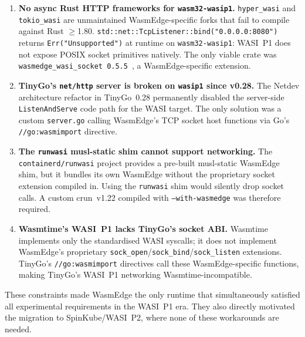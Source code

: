 \begin{enumerate}
    \item \textbf{No async Rust HTTP frameworks for \texttt{wasm32-wasip1}.}
          \texttt{hyper\_wasi} and \texttt{tokio\_wasi} are unmaintained \acs{WasmEdge}-specific forks that fail to compile against Rust $\geq$1.80. \texttt{std::net::TcpListener::bind("0.0.0.0:8080")} returns \texttt{Err("Unsupported")} at runtime on \texttt{wasm32-wasip1}: \acs{WASI}~P1 does not expose \acs{POSIX} socket primitives natively. The only viable crate was \texttt{wasmedge\_wasi\_socket~0.5.5}~\cite{wasmedgewasisocket}, a \acs{WasmEdge}-specific extension.

    \item \textbf{TinyGo's \texttt{net/http} server is broken on \texttt{wasip1} since v0.28.}
          The Netdev architecture refactor in TinyGo~0.28 permanently disabled the server-side \texttt{ListenAndServe} code path for the \acs{WASI} target. The only solution was a custom \texttt{server.go} calling \acs{WasmEdge}'s \acs{TCP} socket host functions via Go's \texttt{//go:wasmimport} directive.

    \item \textbf{The \texttt{runwasi} musl-static shim cannot support networking.}
          The \texttt{containerd/runwasi} project provides a pre-built musl-static \acs{WasmEdge} shim, but it bundles its own \acs{WasmEdge} without the proprietary socket extension compiled in. Using the \texttt{runwasi} shim would silently drop socket calls. A custom crun~v1.22 compiled with \texttt{--with-wasmedge} was therefore required.

    \item \textbf{Wasmtime's \acs{WASI}~P1 lacks TinyGo's socket ABI.}
          Wasmtime implements only the standardised \acs{WASI} syscalls; it does not implement \acs{WasmEdge}'s proprietary \texttt{sock\_open}/\texttt{sock\_bind}/\texttt{sock\_listen} extensions. TinyGo's \texttt{//go:wasmimport} directives call these \acs{WasmEdge}-specific functions, making TinyGo's \acs{WASI}~P1 networking Wasmtime-incompatible.
\end{enumerate}

These constraints made \acs{WasmEdge} the only runtime that simultaneously satisfied all experimental requirements in the \acs{WASI}~P1 era. They also directly motivated the migration to SpinKube/\acs{WASI}~P2, where none of these workarounds are needed.

